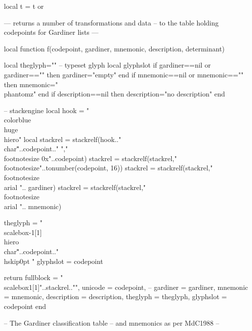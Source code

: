 local t = t or {}

--- returns a number of transformations and data
-- to the table holding codepoints for Gardiner lists
---

local function f(codepoint, gardiner, mnemonic,
                 description, determinant)

     local theglyph=""  -- typeset glyph
     local glyphslot
  if gardiner==nil or gardiner=="" then gardiner="empty" end
     if mnemonic==nil or mnemonic=="" then mnemonic="\\phantom{z}" end
     if description==nil then description="no description" end

-- stackengine
   local hook = "\\color{blue}\\huge\\hiero"
   local stackrel = stackrelf(hook.."\\char\""..codepoint.." ","\\footnotesize 0x"..codepoint)
   stackrel = stackrelf(stackrel,"\\footnotesize"..tonumber(codepoint, 16))
   stackrel = stackrelf(stackrel,"\\footnotesize \\arial ".. gardiner)
   stackrel = stackrelf(stackrel,"\\footnotesize \\arial ".. mnemonic)

   theglyph = "\\scalebox{-1}[1]{\\hiero\\char\""..codepoint.."\\hskip0pt }"
   glyphslot = codepoint

return {  fullblock     = "\\scalebox{1}[1]{"..stackrel.."}",
          unicode       = codepoint, --
          gardiner      = gardiner,
          mnemonic      = mnemonic,
          description   = description,
          theglyph      = theglyph,
          glyphslot     = codepoint}
end

-- The Gardiner classification table
-- and mnemonics as per MdC1988
--

